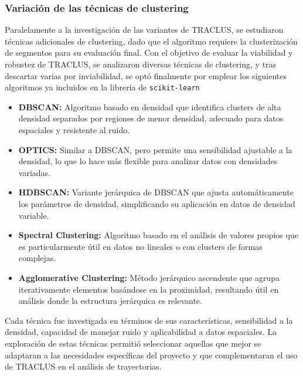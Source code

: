 \subsubsection{Variación de las técnicas de clustering}

Paralelamente a la investigación de las variantes de TRACLUS, se estudiaron técnicas adicionales de clustering, dado que el algoritmo requiere la clusterización de segmentos para su evaluación final. Con el objetivo de evaluar la viabilidad y robustez de TRACLUS, se analizaron diversas técnicas de clustering, y tras descartar varias por inviabilidad, se optó finalmente por emplear los siguientes algoritmos ya incluidos en la librería de \texttt{scikit-learn} \cite{sklearn_cluster}

\begin{itemize}
    \item \textbf{DBSCAN:} Algoritmo basado en densidad que identifica clusters de alta densidad separados por regiones de menor densidad, adecuado para datos espaciales y resistente al ruido.
    
    \item \textbf{OPTICS:} Similar a DBSCAN, pero permite una sensibilidad ajustable a la densidad, lo que lo hace más flexible para analizar datos con densidades variadas.

    \item \textbf{HDBSCAN:} Variante jerárquica de DBSCAN que ajusta automáticamente los parámetros de densidad, simplificando su aplicación en datos de densidad variable.

    \item \textbf{Spectral Clustering:} Algoritmo basado en el análisis de valores propios que es particularmente útil en datos no lineales o con clusters de formas complejas.

    \item \textbf{Agglomerative Clustering:} Método jerárquico ascendente que agrupa iterativamente elementos basándose en la proximidad, resultando útil en análisis donde la estructura jerárquica es relevante.
\end{itemize}

Cada técnica fue investigada en términos de sus características, sensibilidad a la densidad, capacidad de manejar ruido y aplicabilidad a datos espaciales. La exploración de estas técnicas permitió seleccionar aquellas que mejor se adaptaran a las necesidades específicas del proyecto y que complementaran el uso de TRACLUS en el análisis de trayectorias.

